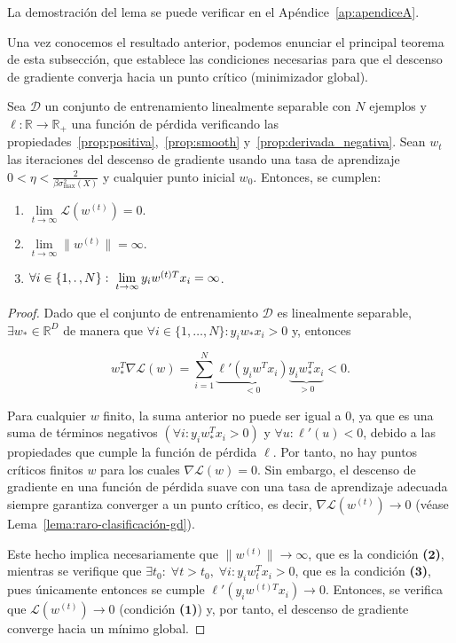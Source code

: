 La demostración del lema se puede verificar en el Apéndice~\ref{ap:apendiceA}.

Una vez conocemos el resultado anterior, podemos enunciar el principal teorema de esta subsección, que establece las condiciones necesarias para que el descenso de gradiente converja hacia un punto crítico (minimizador global).

\begin{teorema}\label{teorema:clasificación-gd}
    Sea $\mathcal{D}$ un conjunto de entrenamiento linealmente separable con $N$ ejemplos y $\ell: \mathbb{R} \to \mathbb{R}_{+}$ una función de pérdida verificando las propiedades~\ref{prop:positiva},~\ref{prop:smooth} y~\ref{prop:derivada_negativa}. Sean $w_t$ las iteraciones del descenso de gradiente usando una tasa de aprendizaje $0 < \eta < \frac{2}{\beta \sigma^{2}_{\max}(X)}$ y cualquier punto inicial $w_0$. Entonces, se cumplen:

    \begin{enumerate}
        \item $\lim \limits_{t \to \infty} \mathcal{L}(w^{(t)}) = 0$.
        \item $\lim \limits_{t \to \infty} \| w^{(t)} \| = \infty$.
        \item $\forall i \in \{ 1, \ldotp, N\}: \; \lim \limits_{t \to \infty} y_i {w}^{(t)T} x_i = \infty$.
    \end{enumerate}
\end{teorema}

\begin{proof}
    Dado que el conjunto de entrenamiento $\mathcal{D}$ es linealmente separable, $\exists w_{*} \in \mathbb{R}^{D}$ de manera que $\forall i \in \{1, \ldots, N \} : y_i w_{*} x_i > 0$ y, entonces

    \[
        w_{*}^{T}\nabla\mathcal{L}(w) = \sum_{i=1}^{N} \underbrace{\ell'(y_i w^{T} x_i)}_{< 0} \underbrace{y_i w_{*}^{T}x_i}_{> 0} < 0.
    \]

    Para cualquier $w$ finito, la suma anterior no puede ser igual a $0$, ya que es una suma de términos negativos $(\forall i: y_i w_{*}^{T}x_i > 0)$ y $\forall u: \ell'(u) < 0$, debido a las propiedades que cumple la función de pérdida $\ell$. Por tanto, no hay puntos críticos finitos $w$ para los cuales $\nabla \mathcal{L}(w) = 0$. Sin embargo, el descenso de gradiente en una función de pérdida suave con una tasa de aprendizaje adecuada siempre garantiza converger a un punto crítico, es decir, $\nabla \mathcal{L}(w^{(t)}) \to 0$ (véase Lema~\ref{lema:raro-clasificación-gd}).
    
    Este hecho implica necesariamente que $\| w^{(t)} \| \to \infty$, que es la condición \textbf{($\boldsymbol{2}$)}, mientras se verifique que $\exists t_0 : \; \forall t > t_0, \; \forall i: y_i w_{t}^{T} x_i > 0$, que es la condición \textbf{($\boldsymbol{3}$)}, pues únicamente entonces se cumple $\ell'(y_i {w}^{(t)T} x_i) \to 0$. Entonces, se verifica que $\mathcal{L}(w^{(t)}) \to 0$ (condición \textbf{($\boldsymbol{1}$)}) y, por tanto, el descenso de gradiente converge hacia un mínimo global.
\end{proof}

